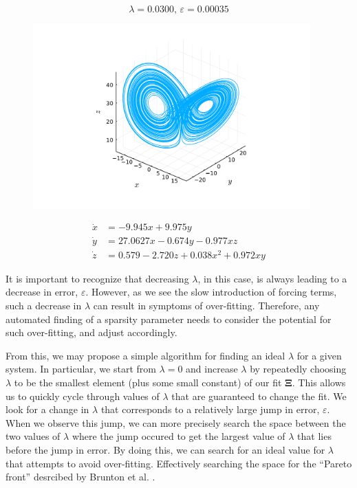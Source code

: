 \documentclass[10pt]{paper}
\begin{document}
\begin{figure}[ptb]
\begin{minipage}{0.47\textwidth}
		\vspace{1em}

		\[ \lambda = 0.0300, \, \varepsilon = 0.00035 \]
		\begin{center}
			\includegraphics[width=0.95\textwidth, trim={4.3cm, 1.6cm, 4.3cm, 2.5cm}, clip]{lorenz_lambda_4.pdf}
		\end{center}
		\[ \begin{aligned}
			\dot x &=-9.945x + 9.975y \\ 
			\dot y &= 27.0627x -0.674y -0.977xz \\ 
			\dot z &= 0.579 -2.720z + 0.038x^2 + 0.972xy
		\end{aligned} \] 
	\end{minipage}
\end{figure}

It is important to recognize that decreasing $\lambda$, in this case, is always leading to a decrease in error, $\varepsilon$. However, as we see the slow introduction of forcing terms, such a decrease in $\lambda$ can result in symptoms of over-fitting. Therefore, any automated finding of a sparsity parameter needs to consider the potential for such over-fitting, and adjust accordingly. 

From this, we may propose a simple algorithm for finding an ideal $\lambda$ for a given system. In particular, we start from $\lambda = 0$ and increase $\lambda$ by repeatedly choosing $\lambda$ to be the smallest element (plus some small constant) of our fit $\mathbf \Xi$.
This allows us to quickly cycle through values of $\lambda$ that are guaranteed to change the fit. We look for a change in $\lambda$ that corresponds to a relatively large jump in error, $\varepsilon$. 
When we observe this jump, we can more precisely search the space between the two values of $\lambda$ where the jump occured to get the largest value of $\lambda$ that lies before the jump in error. 
By doing this, we can search for an ideal value for $\lambda$ that attempts to avoid over-fitting. Effectively searching the space for the ``Pareto front'' desrcibed by Brunton et al. \cite{sindy}. 
\end{document}
